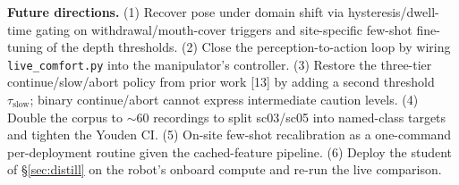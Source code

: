 \documentclass{article}
\newcommand{\code}[1]{\texttt{\small #1}}
\begin{document}
\textbf{Future directions.} (1) Recover pose under domain shift via hysteresis/dwell-time gating on withdrawal/mouth-cover triggers and site-specific few-shot fine-tuning of the depth thresholds. (2) Close the perception-to-action loop by wiring \code{live\_comfort.py} into the manipulator's controller. (3) Restore the three-tier continue/slow/abort policy from prior work [13] by adding a second threshold $\tau_\text{slow}$; binary continue/abort cannot express intermediate caution levels. (4) Double the corpus to $\sim$60 recordings to split sc03/sc05 into named-class targets and tighten the Youden CI. (5) On-site few-shot recalibration as a one-command per-deployment routine given the cached-feature pipeline. (6) Deploy the student of \S\ref{sec:distill} on the robot's onboard compute and re-run the live comparison.



\end{document}
